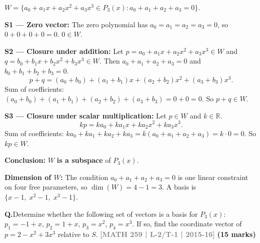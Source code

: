 \documentclass[12pt,a3paper]{article}
\newcommand{\yr}[1]{\hfill\textcolor{gray}{\small\textbf{[#1]}}}
\newcommand{\mk}[1]{\textcolor{orange!70!black}{\small\textbf{(#1 marks)}}}
\newcounter{qnum}
\newcommand{\Q}[1]{%
  \needspace{4\baselineskip}
  \refstepcounter{qnum}
  \vspace{6pt}
  \noindent\textbf{Q\theqnum.}\enspace #1\par
}
\begin{document}
\begin{tcolorbox}[enhanced,breakable,colback=cC!4,colframe=cC,
  boxrule=0.8pt,arc=5pt,
  title={\textbf{Answer}},
  fonttitle=\bfseries\color{white},colbacktitle=cC]

$W = \{a_0+a_1x+a_2x^2+a_3x^3 \in P_3(x) : a_0+a_1+a_2+a_3=0\}$.

\textbf{S1 --- Zero vector:} The zero polynomial has $a_0=a_1=a_2=a_3=0$, so $0+0+0+0=0$. $0\in W$. \checkmark

\textbf{S2 --- Closure under addition:} Let $p=a_0+a_1x+a_2x^2+a_3x^3\in W$ and $q=b_0+b_1x+b_2x^2+b_3x^3\in W$.  Then $a_0+a_1+a_2+a_3=0$ and $b_0+b_1+b_2+b_3=0$.
\[
  p+q = (a_0+b_0)+(a_1+b_1)x+(a_2+b_2)x^2+(a_3+b_3)x^3.
\]
Sum of coefficients: $(a_0+b_0)+(a_1+b_1)+(a_2+b_2)+(a_3+b_3) = 0+0=0$. So $p+q\in W$. \checkmark

\textbf{S3 --- Closure under scalar multiplication:} Let $p\in W$ and $k\in\mathbb{R}$.
\[
  kp = ka_0+ka_1x+ka_2x^2+ka_3x^3.
\]
Sum of coefficients: $ka_0+ka_1+ka_2+ka_3 = k(a_0+a_1+a_2+a_3)=k\cdot 0=0$. So $kp\in W$. \checkmark

\textbf{Conclusion:} $W$ \textbf{is a subspace} of $P_3(x)$.

\medskip
\textbf{Dimension of $W$:} The condition $a_0+a_1+a_2+a_3=0$ is one linear constraint on four free parameters, so $\dim(W)=4-1=3$.  A basis is $\{x-1,\;x^2-1,\;x^3-1\}$.
\end{tcolorbox}

\Q{Determine whether the following set of vectors is a basis for $P_3(x)$: $p_1 = -1 + x$, $p_2 = 1 + x$, $p_3 = x^2$, $p_4 = x^3$. If so, find the coordinate vector of $p = 2 - x^2 + 3x^3$ relative to $S$.
\yr{MATH 259 | L-2/T-1 | 2015-16} \mk{15}}
\end{document}
